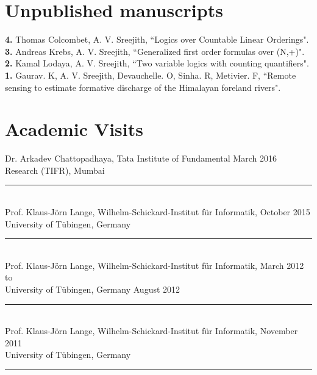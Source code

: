 \documentclass[margin]{res}
\begin{document}
\begin{resume}
\section{Unpublished manuscripts}
{\bf 4.} Thomas Colcombet, A. V. Sreejith, ``Logics over Countable Linear Orderings". \\
{\bf 3.} Andreas Krebs, A. V. Sreejith, ``Generalized first order formulas over (N,+)". \\
{\bf 2.} Kamal Lodaya, A. V. Sreejith, ``Two variable logics with counting quantifiers". \\
{\bf 1.} Gaurav. K, A. V. Sreejith, Devauchelle. O, Sinha. R, Metivier. F, ``Remote sensing to estimate formative discharge of the Himalayan foreland rivers".


\section{Academic Visits}
Dr. Arkadev Chattopadhaya, Tata Institute of Fundamental \hfill March 2016 \\
 Research (TIFR), Mumbai \\
 					\noindent\rule{13cm}{0.4pt} \\
Prof. Klaus-J\"orn Lange, Wilhelm-Schickard-Institut f\"ur Informatik, \hfill October 2015\\
					University of T\"ubingen, Germany \\							
					\noindent\rule{13cm}{0.4pt} \\
Prof. Klaus-J\"orn Lange, Wilhelm-Schickard-Institut f\"ur Informatik, \hfill March 2012 to\\
					University of T\"ubingen, Germany \hfill August 2012 \\
					\noindent\rule{13cm}{0.4pt} \\
Prof. Klaus-J\"orn Lange, Wilhelm-Schickard-Institut f\"ur Informatik, \hfill November 2011\\
					University of T\"ubingen, Germany \\					
					\noindent\rule{13cm}{0.4pt} \\


\end{resume}
\end{document}
